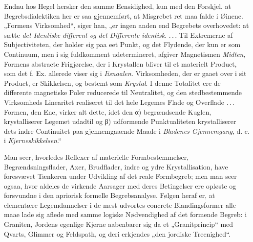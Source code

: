 \documentclass[12pt,a4paper]{book}
\begin{document}
Endnu hos Hegel hersker den samme Eensidighed, kun med den Forskjel, at
Begrebsdialektiken her er saa gjennemført, at Misgrebet ret maa falde i
Øinene. „Formens Virksomhed“, siger han, „er ingen anden end Begrebets
overhovedet: at sætte \emph{det Identiske different og det Differente
identisk}. .\,.\,. Til Extremerne af Subjectiviteten, der holder sig paa
eet Punkt, og det Flydende, der kun er som Continuum, men i sig
fuldkomment udetermineret, afgiver Magnetismen \emph{Midten}, Formens
abstracte Frigjørelse, der i Krystallen bliver til et materielt Product,
som det f. Ex. allerede viser sig i \emph{Iisnaalen}. Virksomheden, der
er gaaet over i sit Product, er Skikkelsen, og bestemt som
\emph{Krystal}. I denne Totalitet ere de differente magnetiske Poler
reducerede til Neutralitet, og den stedbestemmende Virksomheds
Linearitet realiseret til det hele Legemes Flade og Overflade .\,.\,.
Formen, den Ene, virker alt dette, idet den α) begrændsende Kuglen,
krystalliserer Legemet udadtil og β) udformende Punktualiteten
krystalliserer dets indre Continuitet paa gjennemgaaende Maade i
\emph{Bladenes Gjennemgang}, d. e. i \emph{Kjerneskikkelsen}.“

Man seer, hvorledes Reflexer af materielle Formbestemmelser,
Begrændsningsflader, Axer, Brudflader, indre og ydre Krystallisation,
have foresvævet Tænkeren under Udvikling af det reale Formbegreb; men
man seer ogsaa, hvor aldeles de virkende Aarsager med deres Betingelser
ere opløste og forsvundne i den apriorisk formelle Begrebsanalyse.
Følgen heraf er, at elementære Legemdannelser i de mest udvortes
concrete Blandingsformer alle maae lade sig aflede med samme logiske
Nødvendighed af det formende Begreb: i Graniten, Jordens egenlige Kjerne
aabenbarer sig da et „Granitprincip“ med Qvarts, Glimmer og Feldspath,
og deri erkjendes „den jordiske Treenighed“.
\end{document}
